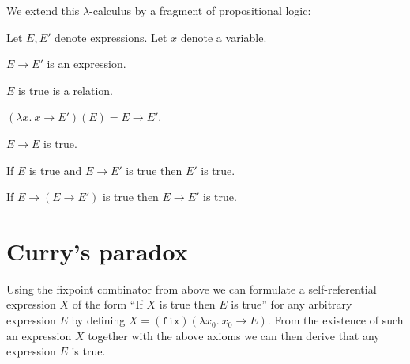\documentclass[english]{article}
\newcommand{\varzero}{x_0}
\newcommand{\abs}[2]{\lambda#1.\ #2}
\newcommand{\app}[2]{(#1)(#2)}
\newcommand{\fix}{\texttt{fix}}
\begin{document}
  \noindent We extend this $\lambda$-calculus by a fragment of propositional
  logic:

  \begin{forthel}  
    Let $E, E'$ denote expressions.
    Let $x$ denote a variable.

    \begin{signature*}[Implication]\label{implication}
      $E \rightarrow E'$ is an expression.
    \end{signature*}
  
    \begin{signature*}[Truth]\label{truth}
      $E$ is true is a relation.
    \end{signature*}
  
    \begin{axiom*}\label{beta_reduction}
      $\app{\abs{x}{x \rightarrow E'}}{E} = E \rightarrow E'$.
    \end{axiom*}
  
    \begin{axiom*}[Reflexivity]\label{reflexivity}
      $E \rightarrow E$ is true.
    \end{axiom*}
  
    \begin{axiom*}\label{modus_ponens}
      If $E$ is true and $E \rightarrow E'$ is true then $E'$ is true.
    \end{axiom*}
  
    \begin{axiom*}[Strengthening]\label{strengthening}
      If $E \rightarrow (E \rightarrow E')$ is true then $E \rightarrow E'$ is true.
    \end{axiom*}
  \end{forthel}


  \section*{Curry's paradox}

  \noindent Using the fixpoint combinator from above we can formulate a 
  self-referential expression $X$ of the form ``If $X$ is true then $E$ is
  true'' for any arbitrary expression $E$ by defining
  $X = \app{\fix}{\abs{\varzero}{\varzero \rightarrow E}}$.
  From the existence of such an expression $X$ together with the above axioms 
  we can then derive that any expression $E$ is true.
\end{document}
